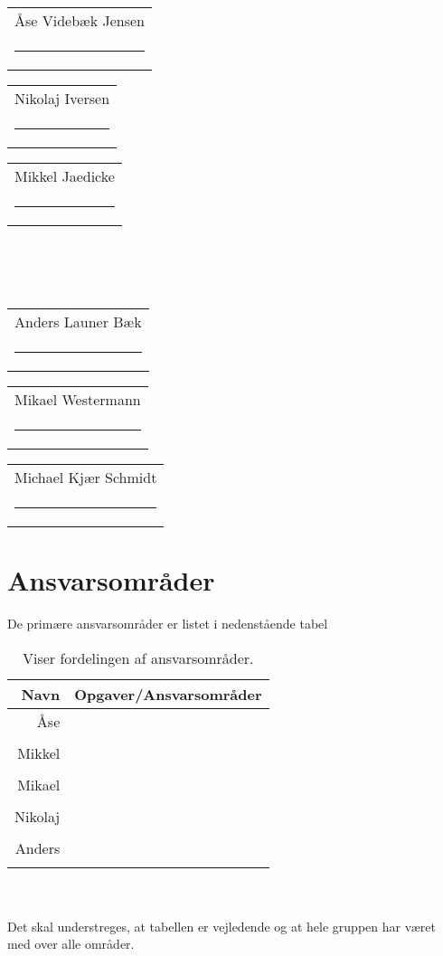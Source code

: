 




\vspace{3cm}
{
\newcommand{\namesigdate}[2][5cm]{%
  \begin{tabular}{@{}p{#1}@{}}
    #2 \\[2\normalbaselineskip] \hrule \\[0pt]
  \end{tabular}
}
\begin{changemargin}{-1cm}{-1cm}
\centering
\noindent \namesigdate{Åse Videbæk Jensen} \hspace{1cm} \namesigdate{Nikolaj Iversen} \hspace{1cm} \namesigdate{Mikkel Jaedicke} \\~\\~\\
\centering
\noindent \namesigdate{Anders Launer Bæk} \hspace{1cm}  \namesigdate{Mikael Westermann} \hspace{1cm}   \namesigdate{Michael Kjær Schmidt}
\end{changemargin}
}
\bigskip
\section*{Ansvarsområder}
De primære ansvarsområder er listet i nedenstående tabel
\bigskip
\begin{table}[!th]
\centering
\setlength{\extrarowheight}{5pt}
 \begin{tabular}{r|l}
Navn&Opgaver/Ansvarsområder \\[6pt] \hline
Åse&\\
&\\[6pt] \hline
Mikkel&\\ 
&\\[6pt] \hline
Mikael&\\
&\\[6pt] \hline
Nikolaj&\\
&\\[6pt] \hline
Anders&\\
&\\
\end{tabular}     
\caption*{Viser fordelingen af ansvarsområder.}            
\end{table}\\~\\ 
Det skal understreges, at tabellen er vejledende og at hele gruppen har været med over alle områder.

